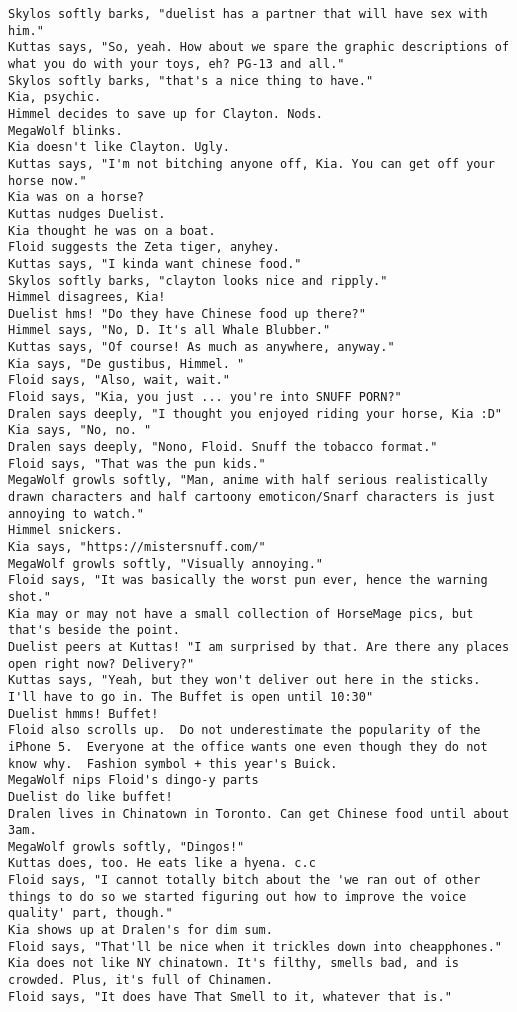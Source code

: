 \begin{verbatim}
Skylos softly barks, "duelist has a partner that will have sex with him."
Kuttas says, "So, yeah. How about we spare the graphic descriptions of what you do with your toys, eh? PG-13 and all."
Skylos softly barks, "that's a nice thing to have."
Kia, psychic.
Himmel decides to save up for Clayton. Nods.
MegaWolf blinks.
Kia doesn't like Clayton. Ugly.
Kuttas says, "I'm not bitching anyone off, Kia. You can get off your horse now."
Kia was on a horse?
Kuttas nudges Duelist.
Kia thought he was on a boat.
Floid suggests the Zeta tiger, anyhey.
Kuttas says, "I kinda want chinese food."
Skylos softly barks, "clayton looks nice and ripply."
Himmel disagrees, Kia!
Duelist hms! "Do they have Chinese food up there?"
Himmel says, "No, D. It's all Whale Blubber."
Kuttas says, "Of course! As much as anywhere, anyway."
Kia says, "De gustibus, Himmel. "
Floid says, "Also, wait, wait."
Floid says, "Kia, you just ... you're into SNUFF PORN?"
Dralen says deeply, "I thought you enjoyed riding your horse, Kia :D"
Kia says, "No, no. "
Dralen says deeply, "Nono, Floid. Snuff the tobacco format."
Floid says, "That was the pun kids."
MegaWolf growls softly, "Man, anime with half serious realistically drawn characters and half cartoony emoticon/Snarf characters is just annoying to watch."
Himmel snickers.
Kia says, "https://mistersnuff.com/"
MegaWolf growls softly, "Visually annoying."
Floid says, "It was basically the worst pun ever, hence the warning shot."
Kia may or may not have a small collection of HorseMage pics, but that's beside the point.
Duelist peers at Kuttas! "I am surprised by that. Are there any places open right now? Delivery?"
Kuttas says, "Yeah, but they won't deliver out here in the sticks. I'll have to go in. The Buffet is open until 10:30"
Duelist hmms! Buffet!
Floid also scrolls up.  Do not underestimate the popularity of the iPhone 5.  Everyone at the office wants one even though they do not know why.  Fashion symbol + this year's Buick.
MegaWolf nips Floid's dingo-y parts
Duelist do like buffet!
Dralen lives in Chinatown in Toronto. Can get Chinese food until about 3am.
MegaWolf growls softly, "Dingos!"
Kuttas does, too. He eats like a hyena. c.c
Floid says, "I cannot totally bitch about the 'we ran out of other things to do so we started figuring out how to improve the voice quality' part, though."
Kia shows up at Dralen's for dim sum.
Floid says, "That'll be nice when it trickles down into cheapphones."
Kia does not like NY chinatown. It's filthy, smells bad, and is crowded. Plus, it's full of Chinamen.
Floid says, "It does have That Smell to it, whatever that is."

\end{verbatim}
